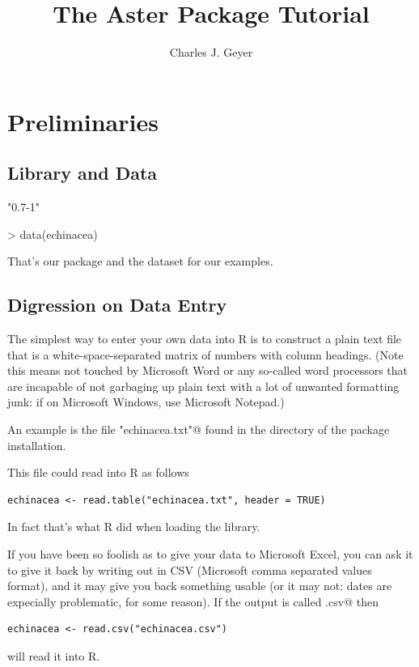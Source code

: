 \documentclass[11pt]{article}
\begin{document}
\title{The Aster Package Tutorial}
\author{Charles J. Geyer}
\maketitle

\section{Preliminaries}

\subsection{Library and Data}

\begin{Schunk}
\begin{Soutput}
[1] "0.7-1"
\end{Soutput}
\begin{Sinput}
> data(echinacea)
\end{Sinput}
\end{Schunk}
That's our package and the dataset for our examples.

\subsection{Digression on Data Entry}

The simplest way to enter your own data into R is to construct a plain
text file that is a white-space-separated matrix of
numbers with column headings.
(Note this means not touched by Microsoft Word or any so-called
word processors that are incapable of not garbaging up plain text
with a lot of unwanted formatting junk: if on Microsoft Windows,
use Microsoft Notepad.)

An example is the file
\verb@"echinacea.txt"@ found in the \verb@data@ directory of the
package installation.

This file could read into R as follows
\begin{verbatim}
echinacea <- read.table("echinacea.txt", header = TRUE)
\end{verbatim}
In fact that's what R did when loading the library.

If you have been so foolish as to give your data to Microsoft Excel,
you can ask it to give it back by writing out in CSV (Microsoft
comma separated values format), and it may give you back something usable
(or it may not: dates are expecially problematic, for some reason).
If the output is called \verb@echinacea.csv@ then
\begin{verbatim}
echinacea <- read.csv("echinacea.csv")
\end{verbatim}
will read it into R.
\end{document}
